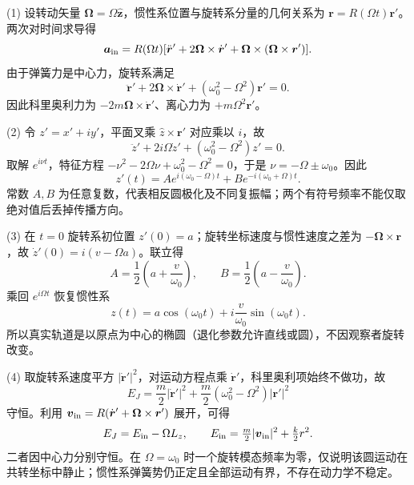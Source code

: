 (1) 设转动矢量 \(\boldsymbol\Omega=\Omega\hat{\boldsymbol z}\)，惯性系位置与旋转系分量的几何关系为 \(\boldsymbol r=R(\Omega t)\boldsymbol r'\)。两次对时间求导得
\[
\boldsymbol a_{\rm in}=R(\Omega t)[\ddot{\boldsymbol r}'+2\boldsymbol\Omega\times\dot{\boldsymbol r}'+\boldsymbol\Omega\times(\boldsymbol\Omega\times\boldsymbol r')].
\]
由于弹簧力是中心力，旋转系满足
\[
\ddot{\boldsymbol r}'+2\boldsymbol\Omega\times\dot{\boldsymbol r}'+(\omega_0^2-\Omega^2)\boldsymbol r'=0.
\]
因此科里奥利力为 \(-2m\boldsymbol\Omega\times\dot{\boldsymbol r}'\)、离心力为 \(+m\Omega^2\boldsymbol r'\)。

(2) 令 \(z'=x'+iy'\)，平面叉乘 \(\hat z\times\boldsymbol r'\) 对应乘以 \(i\)，故
\[
\ddot z'+2i\Omega\dot z'+(\omega_0^2-\Omega^2)z'=0.
\]
取解 \(e^{i\nu t}\)，特征方程 \(-\nu^2-2\Omega\nu+\omega_0^2-\Omega^2=0\)，于是 \(\nu=-\Omega\pm\omega_0\)。因此
\[
z'(t)=A e^{i(\omega_0-\Omega)t}+B e^{-i(\omega_0+\Omega)t}.
\]
常数 \(A,B\) 为任意复数，代表相反圆极化及不同复振幅；两个有符号频率不能仅取绝对值后丢掉传播方向。

(3) 在 \(t=0\) 旋转系初位置 \(z'(0)=a\)；旋转坐标速度与惯性速度之差为 \(-\boldsymbol\Omega\times\boldsymbol r\)，故 \(\dot z'(0)=i(v-\Omega a)\)。联立得
\[
A=\frac12\left(a+\frac{v}{\omega_0}\right),\qquad
B=\frac12\left(a-\frac{v}{\omega_0}\right).
\]
乘回 \(e^{i\Omega t}\) 恢复惯性系
\[
z(t)=a\cos(\omega_0t)+i\frac v{\omega_0}\sin(\omega_0t).
\]
所以真实轨道是以原点为中心的椭圆（退化参数允许直线或圆），不因观察者旋转改变。

(4) 取旋转系速度平方 \(|\dot{\boldsymbol r}'|^2\)，对运动方程点乘 \(\dot{\boldsymbol r}'\)，科里奥利项始终不做功，故
\[
E_J=\frac m2|\dot{\boldsymbol r}'|^2+\frac m2(\omega_0^2-\Omega^2)|\boldsymbol r'|^2
\]
守恒。利用 \(\boldsymbol v_{\rm in}=R(\dot{\boldsymbol r}'+\boldsymbol\Omega\times\boldsymbol r')\) 展开，可得
\[
E_J=E_{\rm in}-\Omega L_z,\qquad
E_{\rm in}=\tfrac m2|\boldsymbol v_{\rm in}|^2+\tfrac k2r^2.
\]
二者因中心力分别守恒。在 \(\Omega=\omega_0\) 时一个旋转模态频率为零，仅说明该圆运动在共转坐标中静止；惯性系弹簧势仍正定且全部运动有界，不存在动力学不稳定。
